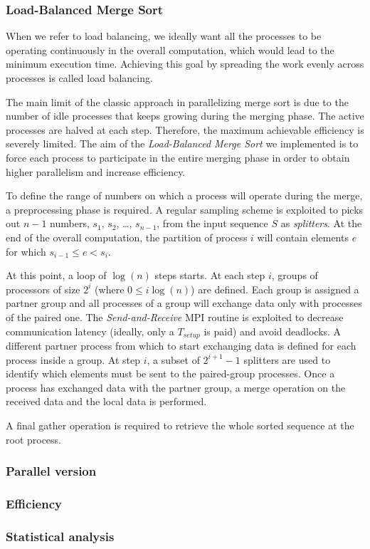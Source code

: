 \subsubsection{Load-Balanced Merge Sort}
When we refer to load balancing, we ideally want all the processes to be operating continuously in the overall computation, which would lead to the minimum execution time. Achieving this goal by spreading the work evenly across processes is called load balancing.

The main limit of the classic approach in parallelizing merge sort is due to the number of idle processes that keeps growing during the merging phase. The active processes are halved at each step. Therefore, the maximum achievable efficiency is severely limited. The aim of the \textit{Load-Balanced Merge Sort} we implemented is to force each process to participate in the entire merging phase in order to obtain higher parallelism and increase efficiency.

To define the range of numbers on which a process will operate during the merge, a preprocessing phase is required. A regular sampling scheme is exploited to picks out $n-1$ numbers, $s_1$, $s_2$, \dots, $s_{n-1}$, from the input sequence $S$ as \textit{splitters}. At the end of the overall computation, the partition of process $i$ will contain elements $e$ for which $s_{i-1} \leq e < s_i$.

At this point, a loop of $\log (n)$ steps starts. At each step $i$, groups of processors of size $2^i$ (where $0 \leq i \log(n)$) are defined. Each group is assigned a partner group and all processes of a group will exchange data only with processes of the paired one. The \textit{Send-and-Receive} MPI routine is exploited to decrease communication latency (ideally, only a $T_{setup}$ is paid) and avoid deadlocks. A different partner process from which to start exchanging data is defined for each process inside a group. At step $i$, a subset of $2^{i+1}-1$ splitters are used to identify which elements must be sent to the paired-group processes. Once a process has exchanged data with the partner group, a merge operation on the received data and the local data is performed.

A final gather operation is required to retrieve the whole sorted sequence at the root process.



\subsubsection*{Parallel version}
\subsubsection*{Efficiency} 
\subsubsection*{Statistical analysis}